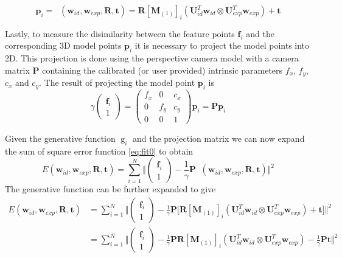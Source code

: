 \documentclass[11pt,a4paper]{report}
\begin{document}
\begin{equation}\label{eq:fit3}
\mathbf{p}_i = \mathop{g_i}(\mathbf{w}_{id},\mathbf{w}_{exp},\mathbf{R},\mathbf{t})
= \mathbf{R}[\mathbf{M}_{(1)}]_{i}(\mathbf{U}_{id}^T\mathbf{w}_{id} \otimes
\mathbf{U}_{exp}^T\mathbf{w}_{exp}) + \mathbf{t}
\end{equation}

Lastly, to measure the disimilarity between the feature points $\mathbf{f}_i$ and the
corresponding 3D model points $\mathbf{p}_i$ it is necessary to project the model points
into 2D. This projection is done using the perspective camera model with a camera matrix $\mathbf{P}$ containing the calibrated (or
user provided) intrinsic parameters $f_x$, $f_y$, $c_x$ and $c_y$. The result of
projecting the model point $\mathbf{p}_i$ is 
\begin{equation}\label{eq:fit5}
\gamma\begin{pmatrix}\mathbf{f}_i\\1\end{pmatrix}
= \begin{pmatrix}f_x&0&c_x\\0&f_y&c_y\\0&0&1\end{pmatrix}\mathbf{p}_i
    = \mathbf{P}\mathbf{p}_i
\end{equation}

Given the generative function $\mathop{g}_i$ and the projection matrix we can now expand the
sum of square error function \ref{eq:fit0} to obtain
\begin{equation}\label{eq:fit6}
E(\mathbf{w}_{id}, \mathbf{w}_{exp}, \mathbf{R}, \mathbf{t}) = \sum_{i=1}^N \Big\Vert\begin{pmatrix}\mathbf{f}_i\\1\end{pmatrix} - \frac{1}{\gamma}\mathbf{P}\mathop{g_i}(\mathbf{w}_{id},\mathbf{w}_{exp},\mathbf{R},\mathbf{t})\Big\Vert^2
\end{equation}
The generative function can be further expanded to give
\begin{align}\label{eq:fit7}
E(\mathbf{w}_{id}, \mathbf{w}_{exp}, \mathbf{R}, \mathbf{t}) &= \sum_{i=1}^N \Big\Vert\begin{pmatrix}\mathbf{f}_i\\1\end{pmatrix} - \frac{1}{\gamma}\mathbf{P}\bigr[\mathbf{R}[\mathbf{M}_{(1)}]_{i}(\mathbf{U}_{id}^T\mathbf{w}_{id} \otimes
\mathbf{U}_{exp}^T\mathbf{w}_{exp}) + \mathbf{t}\bigl]\Big\Vert^2\\\label{eq:fit8}
&=\sum_{i=1}^N \Big\Vert\begin{pmatrix}\mathbf{f}_i\\1\end{pmatrix} - \frac{1}{\gamma}\mathbf{P}\mathbf{R}[\mathbf{M}_{(1)}]_{i}(\mathbf{U}_{id}^T\mathbf{w}_{id} \otimes
\mathbf{U}_{exp}^T\mathbf{w}_{exp}) - \frac{1}{\gamma}\mathbf{P}\mathbf{t}\Big\Vert^2
\end{align}
\end{document}
